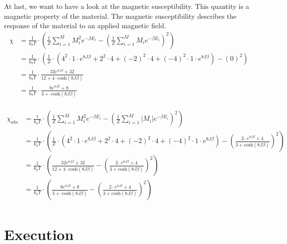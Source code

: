 \documentclass[10pt,a4paper]{article}
\begin{document}
At last, we want to have a look at the magnetic susceptibility. This quantity is a magnetic property of the material. The magnetic susceptibility describes the response of the material to an applied magnetic field. 
\begin{align}
\chi &= \frac{1}{k_b T} \cdot \left( \frac{1}{Z} \sum_{i=1}^{M} M_i^2 e^{- \beta E_i } - \left( \frac{1}{Z} \sum_{i=1}^{M} M_i e^{- \beta E_i }  \right)^2 \right)\\
&= \frac{1}{k_b T} \cdot \left( \frac{1}{Z} \cdot \left( 4^2 \cdot 1 \cdot e^{8J\beta}+ 2^2 \cdot 4+(-2)^2 \cdot 4 + (-4)^2 \cdot 1 \cdot e^{8J \beta } \right) - \left( 0  \right)^2 \right)\\
&= \frac{1}{k_b T} \cdot \frac{32 e^{8J\beta}+32}{ 12+ 4 \cdot \mathrm{cosh} \left( 8J \beta \right)}\\
&= \frac{1}{k_b T} \cdot \frac{8 e^{8J\beta}+8}{ 3+ \cdot \mathrm{cosh} \left( 8J \beta \right)}\\
\end{align}

\begin{align}
\chi_{abs} &= \frac{1}{k_b T} \cdot \left( \frac{1}{Z} \sum_{i=1}^{M} M_i^2 e^{- \beta E_i } - \left( \frac{1}{Z} \sum_{i=1}^{M} |M_i| e^{- \beta E_i }  \right)^2 \right)\\
&= \frac{1}{k_b T} \cdot \left( \frac{1}{Z} \cdot \left( 4^2 \cdot 1 \cdot e^{8J\beta}+ 2^2 \cdot 4+(-2)^2 \cdot 4 + (-4)^2 \cdot 1 \cdot e^{8J \beta } \right) - \left( \frac{2 \cdot e^{8J\beta}+4}{3+ \mathrm{cosh}(8J\beta)} \right)^2 \right)\\
&= \frac{1}{k_b T} \cdot \left( \frac{32 e^{8J\beta}+32}{ 12+ 4 \cdot \mathrm{cosh} \left( 8J \beta \right)}- \left( \frac{2 \cdot e^{8J\beta}+4}{3+ \mathrm{cosh}(8J\beta)} \right)^2 \right)\\
&= \frac{1}{k_b T} \cdot \left(\frac{8 e^{8J\beta}+8}{ 3+ \cdot \mathrm{cosh} \left( 8J \beta \right)}- \left( \frac{2 \cdot e^{8J\beta}+4}{3+ \mathrm{cosh}(8J\beta)} \right)^2 \right)\\
\end{align}

\section{Execution}
\end{document}
